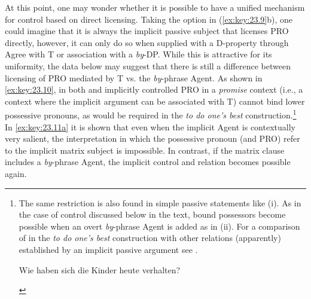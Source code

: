 \documentclass[output=paper]{langsci/langscibook}
\begin{document}
At this point, one may wonder whether it is possible to have a unified
mechanism for control based on direct licensing. Taking the option in
(\ref{ex:key:23.9}b), one could imagine that it is always the implicit passive
subject that licenses PRO directly, however, it can only do so when supplied
with a D-property through Agree with T or association with a \emph{by}-DP.
While this is attractive for its uniformity, the data below may suggest that
there is still a difference between licensing of PRO mediated by T vs. the
\emph{by}-phrase Agent. As shown in \eqref{ex:key:23.10}, in both 
and  implicitly controlled PRO in a \emph{promise} context (i.e., a
context where the implicit argument can be associated with T) cannot bind lower
possessive pronouns, as would be required in the \emph{to do one’s best}
construction.\footnote{The same restriction is also found in simple passive
    statements like (i). As in the case of control discussed below in the text,
    bound possessors become possible when an overt \emph{by}-phrase Agent is
    added as in (ii). For a comparison of  in the \emph{to do one’s
    best} construction with other  relations (apparently) established by
    an implicit passive argument see \citet{Wurmbrand2016}.

\begin{exe}
     
    \sn Wie haben sich die Kinder heute verhalten?
    \begin{xlist}
    \end{xlist}
\end{exe}} In \eqref{ex:key:23.11a} it is shown that even when the implicit
Agent is contextually very salient, the interpretation in which the possessive
pronoun (and PRO) refer to the implicit matrix subject is impossible. In
contrast, if the matrix clause includes a \emph{by}-phrase Agent, the implicit
control and  relation becomes possible again.\largerpage[1]
\end{document}
